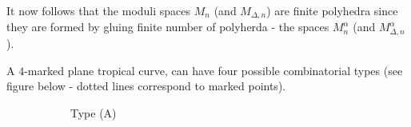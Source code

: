 \begin{remark}    
    It now follows that the moduli spaces $M_{n}$ (and $M_{\Delta, n}$) are finite polyhedra since they are formed by gluing finite number of polyherda - the spaces $M^{\alpha}_{n}$ (and $M_{\Delta,n}^{\alpha}$). 
\end{remark}

\begin{example}[Looking at $M_{4}$]
    A $4$-marked plane tropical curve, can have four possible combinatorial types (see figure below - dotted lines correspond to marked points).
    \begin{figure}[h]
        \centering
        \begin{subfigure}[b]{0.22\textwidth}
            \caption{Type (A)}
        \end{subfigure}
         \begin{subfigure}[b]{0.22\textwidth}

\end{subfigure}
\end{figure}
\end{example}
